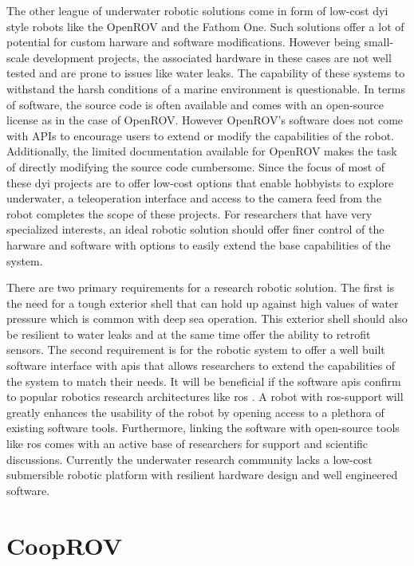 \documentclass {udthesis}
\begin{document}
The other league of underwater robotic solutions come in form of low-cost \gls{dyi} style robots like the OpenROV \cite{openrov} and the Fathom One\cite{fathomrov}. Such solutions offer a lot of potential for custom harware and software modifications. However being small-scale development projects, the associated hardware in these cases are not well tested and are prone to issues like water leaks. The capability of these systems to withstand the harsh conditions of a marine environment is questionable. In terms of software, the source code is often available and comes with an open-source license as in the case of OpenROV. However OpenROV's software does not come with APIs to encourage users to extend or modify the capabilities of the robot. Additionally, the limited documentation available for OpenROV makes the task of directly modifying the source code cumbersome. Since the focus of most of these \gls{dyi} projects are to offer low-cost options that enable hobbyists to explore underwater, a teleoperation interface and access to the camera feed from the robot completes the scope of these projects. For researchers that have very specialized interests, an ideal robotic solution should offer finer control of the harware and software with options to easily extend the base capabilities of the system.

There are two primary requirements for a research robotic solution. The first is the need for a tough exterior shell that can hold up against high values of water pressure which is common with deep sea operation. This exterior shell should also be resilient to water leaks and at the same time offer the ability to retrofit sensors. The second requirement is for the robotic system to offer a well built software interface with \gls{api}s that allows researchers to extend the capabilities of the system to match their needs. It will be beneficial if the software \gls{api}s confirm to popular robotics research architectures like \gls{ros} \cite{ros}. A robot with \gls{ros}-support will greatly enhances the usability of the robot by opening access to a plethora of existing software tools. Furthermore, linking the software with open-source tools like \gls{ros} comes with an active base of researchers for support and scientific discussions. Currently the underwater research community lacks a low-cost submersible robotic platform with resilient hardware design and well engineered software.

\section{CoopROV}
\end{document}
